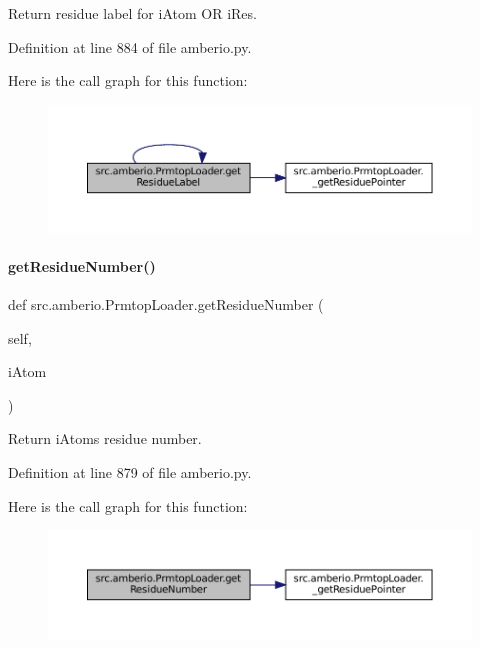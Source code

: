 Return residue label for i\+Atom OR i\+Res. 



Definition at line 884 of file amberio.\+py.

Here is the call graph for this function\+:
\nopagebreak
\begin{figure}[H]
\begin{center}
\leavevmode
\includegraphics[width=350pt]{classsrc_1_1amberio_1_1PrmtopLoader_a75f9c306f8321358b533f67d5354f1b1_cgraph}
\end{center}
\end{figure}
\mbox{\label{classsrc_1_1amberio_1_1PrmtopLoader_a1c394f5a4a11ba80786832824b71d6a7}} 
\paragraph{\texorpdfstring{get\+Residue\+Number()}{getResidueNumber()}}
{\footnotesize\ttfamily def src.\+amberio.\+Prmtop\+Loader.\+get\+Residue\+Number (\begin{DoxyParamCaption}\item[{}]{self,  }\item[{}]{i\+Atom }\end{DoxyParamCaption})}



Return i\+Atom\textquotesingle{}s residue number. 



Definition at line 879 of file amberio.\+py.

Here is the call graph for this function\+:
\nopagebreak
\begin{figure}[H]
\begin{center}
\leavevmode
\includegraphics[width=350pt]{classsrc_1_1amberio_1_1PrmtopLoader_a1c394f5a4a11ba80786832824b71d6a7_cgraph}
\end{center}
\end{figure}


